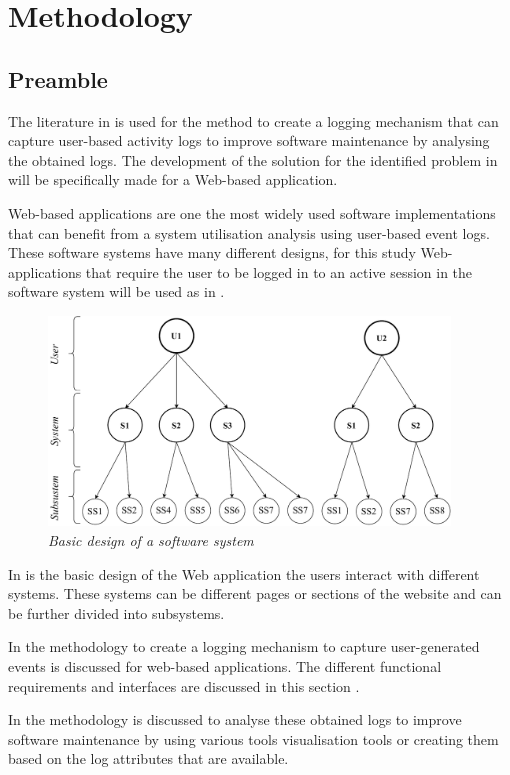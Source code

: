 \chapter{Methodology}
\label{chap:2}

\section{Preamble}\label{sec:ch2_preamble}
 The literature in  is used for the method to create a logging mechanism that can capture user-based activity logs to improve software maintenance by analysing the obtained logs. The development of the solution for the identified problem in  will be specifically made for a Web-based application.\par Web-based applications are one the most widely used software implementations that can benefit from a system utilisation analysis using user-based event logs. These software systems have many different designs, for this study Web-applications that require the user to be logged in to an active session in the software system will be used as in .

 \begin{figure}[!htb] %
	\centering %
	\includegraphics[width=0.95\textwidth]{img/Chapter2/systemOverview/systemOverview.pdf}
	\caption[Basic design of a software system]
	{\textit{Basic design of a software system}}\label{fig:ch2_webSystemBasic}
\end{figure}
 
 In  is the basic design of the Web application the users interact with different systems. These systems can be different pages or sections of the website and can be further divided into subsystems. \par In  the methodology to create a logging mechanism to capture user-generated events is discussed for web-based applications. The different functional requirements and interfaces are discussed in this section \cite{Anish2015}.\par In  the methodology is discussed to analyse these obtained logs to improve software maintenance by using various tools visualisation tools or creating them based on the log attributes that are available.

